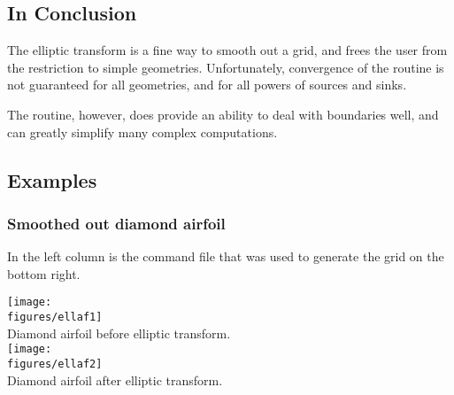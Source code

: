 \subsection{In Conclusion}

The elliptic transform is a fine way to smooth out a grid, and 
frees the user from the restriction to simple geometries.
Unfortunately, convergence of the routine is
not guaranteed for all geometries, and for all powers of sources and sinks.  

The routine, however, does provide an ability to deal with boundaries well, and 
can greatly simplify many complex computations.





\subsection{Examples}

\subsubsection{Smoothed out diamond airfoil}

In the left column is the command file that was used to generate the grid on the bottom right.


\noindent
\begin{minipage}{.4\linewidth}
{\footnotesize
{}
}
\end{minipage}\hfill
\begin{minipage}{.6\linewidth}
  \begin{center}
   \texttt{[image: \\figures/ellaf1]}\\
  {Diamond airfoil before elliptic transform.}    \\
   \texttt{[image: \\figures/ellaf2]}\\
  {Diamond airfoil after elliptic transform.}
  \end{center}
\end{minipage}




 
% 



